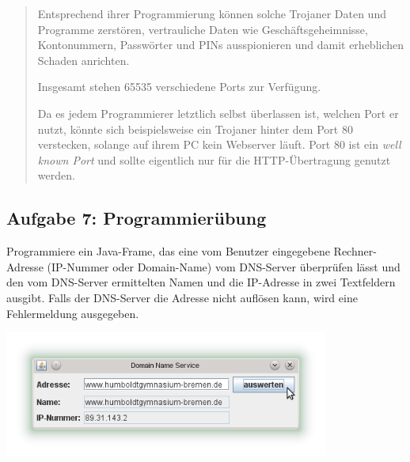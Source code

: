 \begin{compactenum}[a)]
\begin{quotation}
\noindent
Entsprechend ihrer Programmierung können solche Trojaner Daten und Programme
zerstören, vertrauliche Daten wie Geschäftsgeheimnisse, Kontonummern,
Passwörter und PINs ausspionieren und damit erheblichen Schaden anrichten.

\noindent
Insgesamt stehen 65535 verschiedene Ports zur Verfügung. 

\noindent
Da es jedem Programmierer letztlich selbst überlassen ist, welchen Port er
nutzt, könnte sich beispielsweise ein Trojaner hinter dem Port 80 verstecken,
solange auf ihrem PC kein Webserver läuft. Port 80 ist ein \emph{well known
Port} und sollte eigentlich nur für die HTTP-Übertragung genutzt werden.
\end{quotation}
\end{compactenum}


\subsection{Aufgabe 7: Programmierübung}

Programmiere ein Java-Frame, das eine vom Benutzer eingegebene Rechner-Adresse
(IP-Nummer oder Domain-Name) vom DNS-Server überprüfen lässt und den vom
DNS-Server ermittelten Namen und die IP-Adresse in zwei Textfeldern ausgibt.
Falls der DNS-Server die Adresse nicht auflösen kann, wird eine Fehlermeldung
ausgegeben.

\begin{center}
\includegraphics[width=0.8\textwidth]{./inf/SEKII/42_Netzwerke/JavaDNS.png}
\end{center}